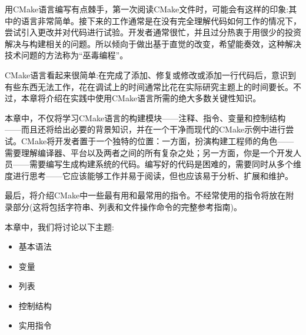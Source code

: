用CMake语言编写有点棘手，第一次阅读CMake文件时，可能会有这样的印象:其中的语言非常简单。接下来的工作通常是在没有完全理解代码如何工作的情况下，尝试引入更改并对代码进行试验。开发者通常很忙，并且过分热衷于用很少的投资解决与构建相关的问题。所以倾向于做出基于直觉的改变，希望能奏效，这种解决技术问题的方法称为“巫毒编程”。

CMake语言看起来很简单:在完成了添加、修复或修改或添加一行代码后，意识到有些东西无法工作，花在调试上的时间通常比花在实际研究主题上的时间要长。不过，本章将介绍在实践中使用CMake语言所需的绝大多数关键性知识。

本章中，不仅将学习CMake语言的构建模块——注释、指令、变量和控制结构——而且还将给出必要的背景知识，并在一个干净而现代的CMake示例中进行尝试。CMake将开发者置于一个独特的位置：一方面，扮演构建工程师的角色——需要理解编译器、平台以及两者之间的所有复杂之处；另一方面，你是一个开发人员——需要编写生成构建系统的代码。编写好的代码是困难的，需要同时从多个维度进行思考——它应该能够工作并易于阅读，但也应该易于分析、扩展和维护。

最后，将介绍CMake中一些最有用和最常用的指令。不经常使用的指令将放在附录部分(这将包括字符串、列表和文件操作命令的完整参考指南)。

本章中，我们将讨论以下主题:

\begin{itemize}
\item 
基本语法

\item 
变量

\item 
列表

\item 
控制结构

\item 
实用指令
\end{itemize}